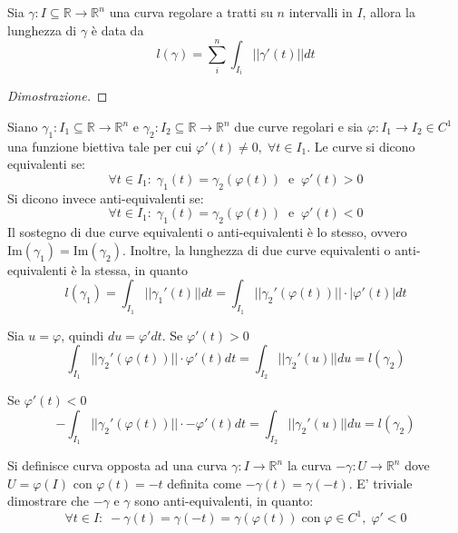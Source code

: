             \begin{theorem}
                Sia $\gamma: I \subseteq \mathbb{R} \rightarrow \mathbb{R}^{n}$ una curva regolare a tratti su $n$ intervalli in $I$, allora la lunghezza di $\gamma$ è data da
                \[
                    l(\gamma) = \sum_{i}^{n} \int_{I_i} ||\gamma'(t)|| dt
                \]
            \end{theorem}
            \begin{proof}[Dimostrazione]

            \end{proof}

            Siano $\gamma_1: I_1 \subseteq \mathbb{R} \rightarrow \mathbb{R}^{n}$ e $\gamma_2: I_2 \subseteq \mathbb{R} \rightarrow \mathbb{R}^{n}$ due curve regolari e sia $\varphi: I_{1} \rightarrow I_{2} \in C^{1}$ una funzione biettiva tale per cui $\varphi'(t) \neq 0, \; \forall t \in I_{1}$.
            Le curve si dicono equivalenti se:
            \[
                \forall t \in I_{1}: \; \gamma_{1}(t) = \gamma_{2}(\varphi(t)) \;\; \text{e} \;\; \varphi'(t) > 0
            \]
            Si dicono invece anti-equivalenti se:
            \[
                \forall t \in I_{1}: \; \gamma_{1}(t) = \gamma_{2}(\varphi(t)) \;\; \text{e} \;\; \varphi'(t) < 0
            \]
            Il sostegno di due curve equivalenti o anti-equivalenti è lo stesso, ovvero $\text{Im}(\gamma_{1}) = \text{Im}(\gamma_{2})$.
            Inoltre, la lunghezza di due curve equivalenti o anti-equivalenti è la stessa, in quanto
            \[
                l(\gamma_{1}) = \int_{I_{1}} || \gamma_{1}'(t) || dt = \int_{I_{1}} || \gamma_{2}'(\varphi(t)) || \cdot |\varphi'(t)| dt
            \]

            Sia $u = \varphi$, quindi $du = \varphi' dt$. Se $\varphi'(t) > 0$
            \[
                \int_{I_{1}} || \gamma_{2}'(\varphi(t)) || \cdot \varphi'(t) dt = \int_{I_{2}} || \gamma_{2}'(u) || du = l(\gamma_{2})
            \]

            Se $\varphi'(t) < 0$
            \[
                -\int_{I_{1}} || \gamma_{2}'(\varphi(t)) || \cdot -\varphi'(t) dt = \int_{I_{2}} || \gamma_{2}'(u) || du = l(\gamma_{2})
            \]


            Si definisce curva opposta ad una curva $\gamma: I \rightarrow \mathbb{R}^{n}$ la curva $-\gamma: U \rightarrow \mathbb{R}^{n}$ dove $U = \varphi(I)$ con $\varphi(t) = -t$ definita come $-\gamma(t) = \gamma(-t)$.
            E' triviale dimostrare che $-\gamma$ e $\gamma$ sono anti-equivalenti, in quanto:
            \[
                \forall t \in I: \; -\gamma(t) = \gamma(-t) = \gamma(\varphi(t)) \; \text{con} \; \varphi \in C^{1}, \; \varphi' < 0
            \]

